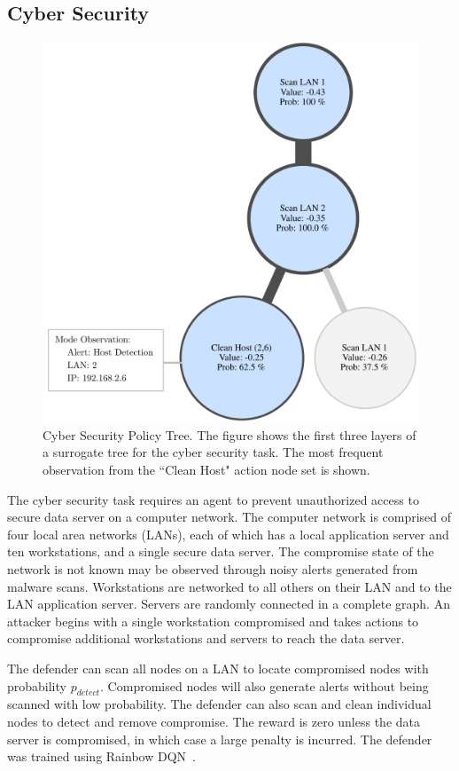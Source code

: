\documentclass[letterpaper]{article} %
\begin{document}
\subsection{Cyber Security}
\begin{figure}[t]
    \centering
    \includegraphics[width=0.99\columnwidth]{figs/cyber_tree.pdf}
    \caption{Cyber Security Policy Tree. The figure shows the first three layers of a surrogate tree for the cyber security task. The most frequent observation from the ``Clean Host" action node set is shown.}
    \label{fig: cyber tree}
\end{figure}
The cyber security task requires an agent to prevent unauthorized access to secure data server on a computer network. 
The computer network is comprised of four local area networks (LANs), each of which has a local application server and ten workstations, and a single secure data server. 
The compromise state of the network is not known may be observed through noisy alerts generated from malware scans. 
Workstations are networked to all others on their LAN and to the LAN application server. 
Servers are randomly connected in a complete graph. 
An attacker begins with a single workstation compromised and takes actions to compromise additional workstations and servers to reach the data server. 

The defender can scan all nodes on a LAN to locate compromised nodes with probability $p_{detect}$. 
Compromised nodes will also generate alerts without being scanned with low probability.
The defender can also scan and clean individual nodes to detect and remove compromise. 
The reward is zero unless the data server is compromised, in which case a large penalty is incurred.
The defender was trained using Rainbow DQN~\cite{hessel2018}.
\end{document}
